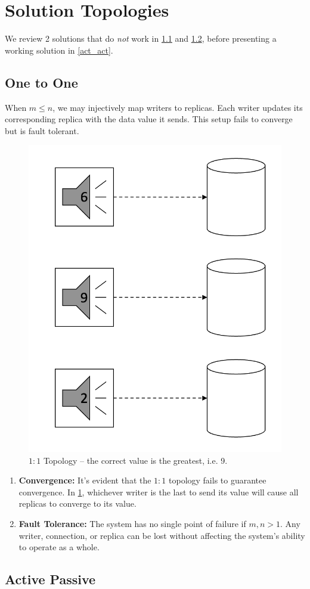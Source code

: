 \documentclass[12pt]{article}
\begin{document}
\section{Solution Topologies}

We review 2 solutions that do \emph{not} work in \cref{1_1} and \cref{act_pass}, before presenting a working solution in \cref{act_act}.

\subsection{One to One} \label{1_1}

When \(m \leq n\), we may injectively map writers to replicas. Each writer updates its corresponding replica with the data value it sends. This setup fails to converge but is fault tolerant.

\begin{figure}[htbp]
	\centering
	\includegraphics[width=.45\textwidth]{one_one.png}
	\caption{\(1 : 1\) Topology -- the correct value is the greatest, i.e. 9.}
	\label{one_one_img}
\end{figure}

\begin{enumerate}
	\item \textbf{Convergence:} It's evident that the \(1 : 1\) topology fails to guarantee convergence. In \cref{one_one_img}, whichever writer is the last to send its value will cause all replicas to converge to its value.
	
	\item \textbf{Fault Tolerance:} The system has no single point of failure if \(m, n > 1\). Any writer, connection, or replica can be lost without affecting the system's ability to operate as a whole.
\end{enumerate}

\subsection{Active Passive} \label{act_pass}
\end{document}
